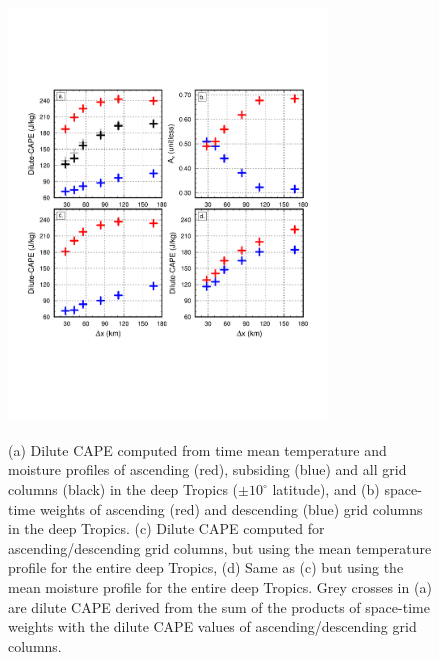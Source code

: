 \documentclass[times]{qjrms4}
\begin{document}
\begin{figure}
\begin{center}
\noindent\includegraphics[width=20pc,angle=0]{figs/temp_cape.pdf}\\
\end{center}
\caption{(a) Dilute CAPE computed from time mean temperature and moisture profiles of ascending (red), subsiding (blue) and all grid columns (black) in the deep Tropics ($\pm 10^{\circ}$ latitude), and (b) space-time weights of ascending (red) and descending (blue) grid columns in the deep Tropics. (c) Dilute CAPE computed for ascending/descending grid columns, but using the mean temperature profile for the entire deep Tropics, (d) Same as (c) but using the mean moisture profile for the entire deep Tropics. Grey crosses in (a) are dilute CAPE derived from the sum of the products of space-time weights with the dilute CAPE values of ascending/descending grid columns.}
\label{fig:cape}
\end{figure}
\end{document}
